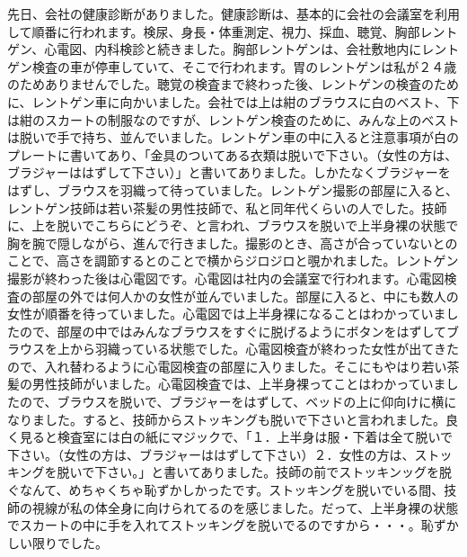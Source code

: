 先日、会社の健康診断がありました。健康診断は、基本的に会社の会議室を利用して順番に行われます。検尿、身長・体重測定、視力、採血、聴覚、胸部レントゲン、心電図、内科検診と続きました。胸部レントゲンは、会社敷地内にレントゲン検査の車が停車していて、そこで行われます。胃のレントゲンは私が２４歳のためありませんでした。聴覚の検査まで終わった後、レントゲンの検査のために、レントゲン車に向かいました。会社では上は紺のブラウスに白のベスト、下は紺のスカートの制服なのですが、レントゲン検査のために、みんな上のベストは脱いで手で持ち、並んでいました。レントゲン車の中に入ると注意事項が白のプレートに書いてあり、「金具のついてある衣類は脱いで下さい。（女性の方は、ブラジャーははずして下さい）」と書いてありました。しかたなくブラジャーをはずし、ブラウスを羽織って待っていました。レントゲン撮影の部屋に入ると、レントゲン技師は若い茶髪の男性技師で、私と同年代くらいの人でした。技師に、上を脱いでこちらにどうぞ、と言われ、ブラウスを脱いで上半身裸の状態で胸を腕で隠しながら、進んで行きました。撮影のとき、高さが合っていないとのことで、高さを調節するとのことで横からジロジロと覗かれました。レントゲン撮影が終わった後は心電図です。心電図は社内の会議室で行われます。心電図検査の部屋の外では何人かの女性が並んでいました。部屋に入ると、中にも数人の女性が順番を待っていました。心電図では上半身裸になることはわかっていましたので、部屋の中ではみんなブラウスをすぐに脱げるようにボタンをはずしてブラウスを上から羽織っている状態でした。心電図検査が終わった女性が出てきたので、入れ替わるように心電図検査の部屋に入りました。そこにもやはり若い茶髪の男性技師がいました。心電図検査では、上半身裸ってことはわかっていましたので、ブラウスを脱いで、ブラジャーをはずして、ベッドの上に仰向けに横になりました。すると、技師からストッキングも脱いで下さいと言われました。良く見ると検査室には白の紙にマジックで、「１．上半身は服・下着は全て脱いで下さい。（女性の方は、ブラジャーははずして下さい）２．女性の方は、ストッキングを脱いで下さい。」と書いてありました。技師の前でストッキンッグを脱ぐなんて、めちゃくちゃ恥ずかしかったです。ストッキングを脱いでいる間、技師の視線が私の体全身に向けられてるのを感じました。だって、上半身裸の状態でスカートの中に手を入れてストッキングを脱いでるのですから・・・。恥ずかしい限りでした。

